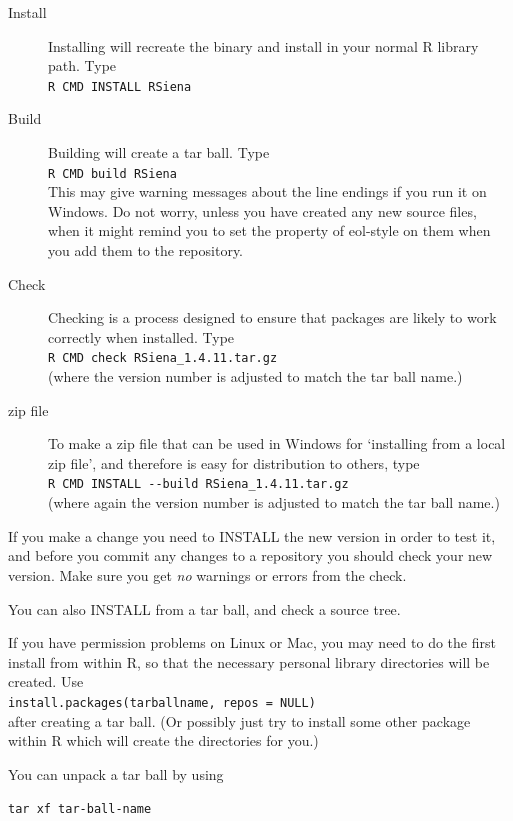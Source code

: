 \documentclass[a4paper,fleqn,11pt]{article}
\newcommand{\+}{\, + \,}
\begin{document}
\begin{description}
\item[Install] Installing will recreate the binary and install in your normal R
  library path. Type\\
\verb|R CMD INSTALL RSiena|
\item[Build] Building will create a tar ball. Type\\
\verb|R CMD build RSiena|\\
This may give warning messages about the line endings if you run it on
Windows. Do not worry, unless you have created any new source files, when it
might remind you to set the property of \textsf{eol-style} on them when you add
them to the repository.
\item [Check] Checking is a process designed to ensure that packages are likely
  to work correctly when installed. Type\\
\verb|R CMD check RSiena_1.4.11.tar.gz|\\
(where the version number is adjusted to match the tar ball name.)
\item[zip file] To make a zip file that can be used in Windows for
`installing from a local zip file', and therefore is easy for distribution
to others, type\\
\verb|R CMD INSTALL --build RSiena_1.4.11.tar.gz| \\
(where again the version number is adjusted to match the tar ball name.)
\end{description}

If you make a change you need to \textsf{INSTALL} the new version in order to
test it, and before you commit any changes to a repository you should
\textsf{check} your new version. Make sure you get \emph{no} warnings or
errors from the check.

You can also \textsf{INSTALL} from a tar ball, and \textsf{check} a source
tree.

If you have permission problems on Linux or Mac, you may need to do the first
install from within \textsf{R}, so that the necessary personal library
directories will be created. Use\\
\verb|install.packages(tarballname, repos = NULL)| \\after creating a tar
ball. (Or possibly just try to install some other package within R which will
create the directories for you.)

You can unpack a tar ball by using

\verb|tar xf tar-ball-name|
\end{document}

